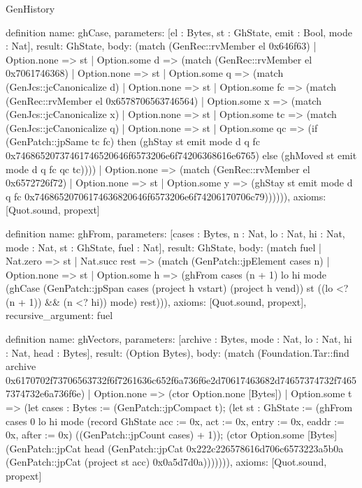 \begin{lexlean}{GenHistory}
\begin{semanticmodule}
definition{
  name: ghCase,
  parameters: [el : Bytes, st : GhState, emit : Bool, mode : Nat],
  result: GhState,
  body: (match (GenRec::rvMember el 0x646f63)
    | Option.none => st
    | Option.some d => (match (GenRec::rvMember el 0x7061746368)
      | Option.none => st
      | Option.some q => (match (GenJcs::jcCanonicalize d)
        | Option.none => st
        | Option.some fc => (match (GenRec::rvMember el 0x6578706563746564)
          | Option.some x => (match (GenJcs::jcCanonicalize x)
            | Option.none => st
            | Option.some tc => (match (GenJcs::jcCanonicalize q)
              | Option.none => st
              | Option.some qc => (if (GenPatch::jpSame tc fc) then (ghStay st emit mode d q fc 0x74686520737461746520646f6573206e6f74206368616e6765) else (ghMoved st emit mode d q fc qc tc))))
          | Option.none => (match (GenRec::rvMember el 0x6572726f72)
            | Option.none => st
            | Option.some y => (ghStay st emit mode d q fc 0x74686520706174636820646f6573206e6f74206170706c79)))))),
  axioms: [Quot.sound, propext]
}

definition{
  name: ghFrom,
  parameters: [cases : Bytes, n : Nat, lo : Nat, hi : Nat, mode : Nat, st : GhState, fuel : Nat],
  result: GhState,
  body: (match fuel
    | Nat.zero => st
    | Nat.succ rest => (match (GenPatch::jpElement cases n)
      | Option.none => st
      | Option.some h => (ghFrom cases (n + 1) lo hi mode (ghCase (GenPatch::jpSpan cases (project h vstart) (project h vend)) st ((lo <? (n + 1)) && (n <? hi)) mode) rest))),
  axioms: [Quot.sound, propext],
  recursive_argument: fuel
}

definition{
  name: ghVectors,
  parameters: [archive : Bytes, mode : Nat, lo : Nat, hi : Nat, head : Bytes],
  result: (Option Bytes),
  body: (match (Foundation.Tar::find archive 0x6170702f73706563732f6f7261636c652f6a736f6e2d70617463682d74657374732f74657374732e6a736f6e)
    | Option.none => (ctor Option.none [Bytes])
    | Option.some t => (let cases : Bytes := (GenPatch::jpCompact t); (let st : GhState := (ghFrom cases 0 lo hi mode (record GhState {acc := 0x, act := 0x, entry := 0x, eaddr := 0x, after := 0x}) ((GenPatch::jpCount cases) + 1)); (ctor Option.some [Bytes] (GenPatch::jpCat head (GenPatch::jpCat 0x222c226578616d706c6573223a5b0a (GenPatch::jpCat (project st acc) 0x0a5d7d0a))))))),
  axioms: [Quot.sound, propext]
}
\end{semanticmodule}
\end{lexlean}
